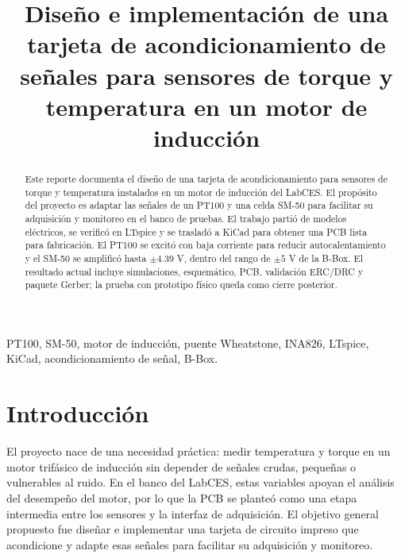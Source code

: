 \documentclass[conference]{IEEEtran}
\begin{document}
\title{Diseño e implementación de una tarjeta de acondicionamiento de señales para sensores de torque y temperatura en un motor de inducción}

\author{
}

\maketitle

\begin{abstract}
Este reporte documenta el diseño de una tarjeta de acondicionamiento para sensores de torque y temperatura instalados en un motor de inducción del LabCES. El propósito del proyecto es adaptar las señales de un PT100 y una celda SM-50 para facilitar su adquisición y monitoreo en el banco de pruebas. El trabajo partió de modelos eléctricos, se verificó en LTspice y se trasladó a KiCad para obtener una PCB lista para fabricación. El PT100 se excitó con baja corriente para reducir autocalentamiento y el SM-50 se amplificó hasta $\pm4.39$ V, dentro del rango de $\pm5$ V de la B-Box. El resultado actual incluye simulaciones, esquemático, PCB, validación ERC/DRC y paquete Gerber; la prueba con prototipo físico queda como cierre posterior.
\end{abstract}

\begin{IEEEkeywords}
PT100, SM-50, motor de inducción, puente Wheatstone, INA826, LTspice, KiCad, acondicionamiento de señal, B-Box.
\end{IEEEkeywords}

\section{Introducción}

El proyecto nace de una necesidad práctica: medir temperatura y torque en un motor trifásico de inducción sin depender de señales crudas, pequeñas o vulnerables al ruido. En el banco del LabCES, estas variables apoyan el análisis del desempeño del motor, por lo que la PCB se planteó como una etapa intermedia entre los sensores y la interfaz de adquisición. El objetivo general propuesto fue diseñar e implementar una tarjeta de circuito impreso que acondicione y adapte esas señales para facilitar su adquisición y monitoreo.
\end{document}
